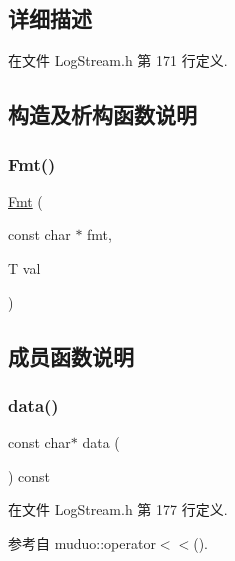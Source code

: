 \subsection{详细描述}


在文件 Log\+Stream.\+h 第 171 行定义.



\subsection{构造及析构函数说明}
\mbox{\label{classmuduo_1_1Fmt_a06d5ef710a16a0d6256f8fe44ef18055}} 
\subsubsection{\texorpdfstring{Fmt()}{Fmt()}}
{\footnotesize\ttfamily \hyperlink{classmuduo_1_1Fmt}{Fmt} (\begin{DoxyParamCaption}\item[{const char $\ast$}]{fmt,  }\item[{T}]{val }\end{DoxyParamCaption})}



\subsection{成员函数说明}
\mbox{\label{classmuduo_1_1Fmt_a39a256207a84f316547e36c755373d03}} 
\subsubsection{\texorpdfstring{data()}{data()}}
{\footnotesize\ttfamily const char$\ast$ data (\begin{DoxyParamCaption}{ }\end{DoxyParamCaption}) const\hspace{0.3cm}{\ttfamily [inline]}}



在文件 Log\+Stream.\+h 第 177 行定义.



参考自 muduo\+::operator$<$$<$().

